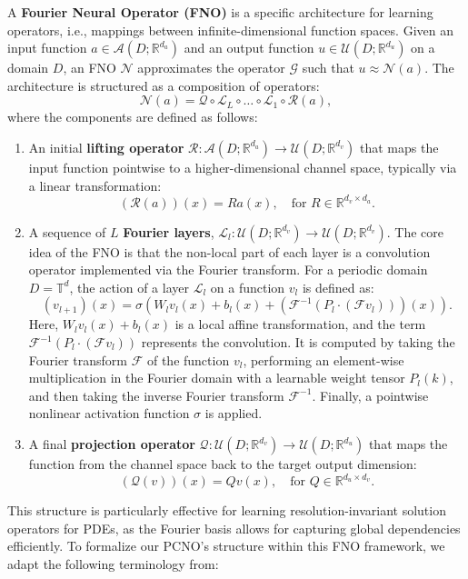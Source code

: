 \documentclass[pdflatex,sn-mathphys-num]{sn-jnl}%
\theoremstyle{thmstyleone}%
\numberwithin{equation}{section}
\begin{document}
A \textbf{Fourier Neural Operator (FNO)} is a specific architecture for learning operators, i.e., mappings between infinite-dimensional function spaces. Given an input function $a \in \mathcal{A}(D;\mathbb{R}^{d_a})$ and an output function $u \in \mathcal{U}(D;\mathbb{R}^{d_u})$ on a domain $D$, an FNO $\mathcal{N}$ approximates the operator $\mathcal{G}$ such that $u \approx \mathcal{N}(a)$. The architecture is structured as a composition of operators:
$$\mathcal{N}(a) = \mathcal{Q} \circ \mathcal{L}_{L} \circ \dots \circ \mathcal{L}_{1} \circ \mathcal{R}(a),$$
where the components are defined as follows:
\begin{enumerate}
    \item An initial \textbf{lifting operator} $\mathcal{R}: \mathcal{A}(D;\mathbb{R}^{d_a}) \to \mathcal{U}(D;\mathbb{R}^{d_v})$ that maps the input function pointwise to a higher-dimensional channel space, typically via a linear transformation:
    $$(\mathcal{R}(a))(x) = Ra(x), \quad \text{for } R \in \mathbb{R}^{d_v \times d_a}.$$

    \item A sequence of $L$ \textbf{Fourier layers}, $\mathcal{L}_l: \mathcal{U}(D;\mathbb{R}^{d_v}) \to \mathcal{U}(D;\mathbb{R}^{d_v})$. The core idea of the FNO is that the non-local part of each layer is a convolution operator implemented via the Fourier transform. For a periodic domain $D=\mathbb{T}^d$, the action of a layer $\mathcal{L}_l$ on a function $v_l$ is defined as:
    $$(v_{l+1})(x) = \sigma \left( W_l v_l(x) + b_l(x) + \left(\mathcal{F}^{-1}(P_l \cdot (\mathcal{F}v_l))\right)(x) \right).$$
    Here, $W_l v_l(x) + b_l(x)$ is a local affine transformation, and the term $\mathcal{F}^{-1}(P_l \cdot (\mathcal{F}v_l))$ represents the convolution. It is computed by taking the Fourier transform $\mathcal{F}$ of the function $v_l$, performing an element-wise multiplication in the Fourier domain with a learnable weight tensor $P_l(k)$, and then taking the inverse Fourier transform $\mathcal{F}^{-1}$. Finally, a pointwise nonlinear activation function $\sigma$ is applied.

    \item A final \textbf{projection operator} $\mathcal{Q}: \mathcal{U}(D;\mathbb{R}^{d_v}) \to \mathcal{U}(D;\mathbb{R}^{d_u})$ that maps the function from the channel space back to the target output dimension:
    $$(\mathcal{Q}(v))(x) = Qv(x), \quad \text{for } Q \in \mathbb{R}^{d_u \times d_v}.$$
\end{enumerate}
This structure is particularly effective for learning resolution-invariant solution operators for PDEs, as the Fourier basis allows for capturing global dependencies efficiently. To formalize our PCNO's structure within this FNO framework, we adapt the following terminology from:
\end{document}
